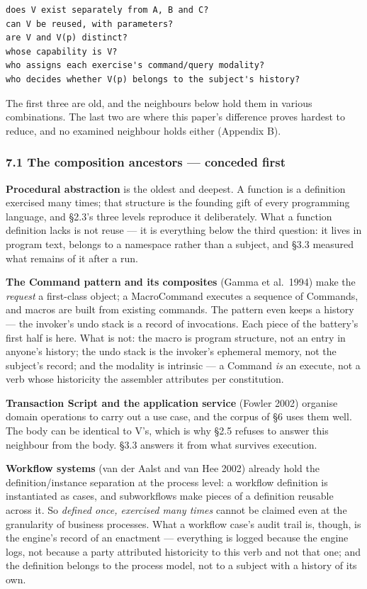 \documentclass[
]{article}
\begin{document}
\begin{verbatim}
does V exist separately from A, B and C?
can V be reused, with parameters?
are V and V(p) distinct?
whose capability is V?
who assigns each exercise's command/query modality?
who decides whether V(p) belongs to the subject's history?
\end{verbatim}

The first three are old, and the neighbours below hold them in various
combinations. The last two are where this paper's difference proves
hardest to reduce, and no examined neighbour holds either (Appendix B).

\subsubsection{7.1 The composition ancestors --- conceded
first}\label{the-composition-ancestors-conceded-first}

\textbf{Procedural abstraction} is the oldest and deepest. A function is
a definition exercised many times; that structure is the founding gift
of every programming language, and §2.3's three levels reproduce it
deliberately. What a function definition lacks is not reuse --- it is
everything below the third question: it lives in program text, belongs
to a namespace rather than a subject, and §3.3 measured what remains of
it after a run.

\textbf{The Command pattern and its composites} (Gamma et al.~1994) make
the \emph{request} a first-class object; a MacroCommand executes a
sequence of Commands, and macros are built from existing commands. The
pattern even keeps a history --- the invoker's undo stack is a record of
invocations. Each piece of the battery's first half is here. What is
not: the macro is program structure, not an entry in anyone's history;
the undo stack is the invoker's ephemeral memory, not the subject's
record; and the modality is intrinsic --- a Command \emph{is} an
execute, not a verb whose historicity the assembler attributes per
constitution.

\textbf{Transaction Script and the application service} (Fowler 2002)
organise domain operations to carry out a use case, and the corpus of §6
uses them well. The body can be identical to V's, which is why §2.5
refuses to answer this neighbour from the body. §3.3 answers it from
what survives execution.

\textbf{Workflow systems} (van der Aalst and van Hee 2002) already hold
the definition/instance separation at the process level: a workflow
definition is instantiated as cases, and subworkflows make pieces of a
definition reusable across it. So \emph{defined once, exercised many
times} cannot be claimed even at the granularity of business processes.
What a workflow case's audit trail is, though, is the engine's record of
an enactment --- everything is logged because the engine logs, not
because a party attributed historicity to this verb and not that one;
and the definition belongs to the process model, not to a subject with a
history of its own.
\end{document}
